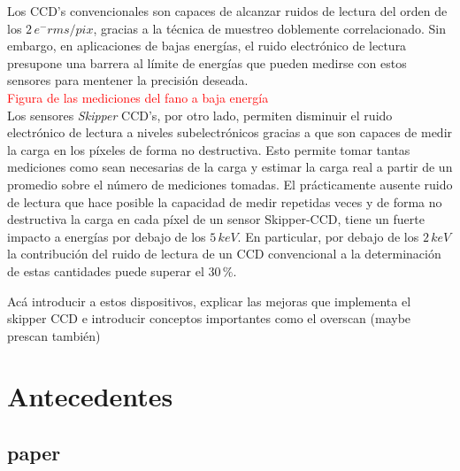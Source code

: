 Los CCD's convencionales son capaces de alcanzar ruidos de lectura del orden de los $2\,e^{-}\si{rms/pix}$, gracias a la técnica de muestreo doblemente correlacionado. Sin embargo, en aplicaciones de bajas energías, el ruido electrónico de lectura presupone una barrera al límite de energías que pueden medirse con estos sensores para mentener la precisión deseada.\\
\textcolor{red}{Figura de las mediciones del fano a baja energía}\\
\indent Los sensores \textit{Skipper} CCD's, por otro lado, permiten disminuir el ruido electrónico de lectura a niveles subelectrónicos gracias a que son capaces de medir la carga en los píxeles de forma no destructiva. Esto permite tomar tantas mediciones como sean necesarias de la carga y estimar la carga real a partir de un promedio sobre el número de mediciones tomadas. El prácticamente ausente ruido de lectura que hace posible la capacidad de medir repetidas veces y de forma no destructiva la carga en cada píxel de un sensor Skipper-CCD, tiene un fuerte impacto a energías por debajo de los $5\,\si{keV}$. En particular, por debajo de los $2\,\si{keV}$ la contribución del ruido de lectura de un CCD convencional a la determinación de estas cantidades puede superar el $30\,\%$. %


Acá introducir a estos dispositivos, explicar las mejoras que implementa el skipper CCD e introducir conceptos importantes como el overscan (maybe prescan también)
\section{Antecedentes}

\subsection{paper}

